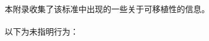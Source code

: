 
\paragraph{}
本附录收集了该标准中出现的一些关于可移植性的信息。

\paragraph{}
以下为未指明行为：
\begin{itemize} %
\newcommand{\itm}[1]{\stepcounter{itmcntr}\item{#1
  \marginpar{\tsup{(\thesection.\theitmcntr)}}}}


\end{itemize}
